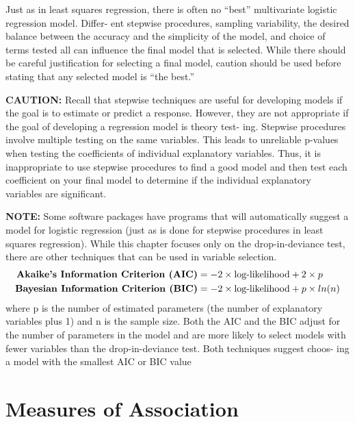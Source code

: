 \documentclass[
]{report}
\begin{document}
Just as in least squares regression, there is often no ``best'' multivariate logistic regression model. Differ-
ent stepwise procedures, sampling variability, the desired balance between the accuracy and the simplicity
of the model, and choice of terms tested all can influence the final model that is selected. While there should
be careful justification for selecting a final model, caution should be used before stating that any selected
model is ``the best.''

\large

\textbf{CAUTION:}
Recall that stepwise techniques are useful for developing models if the goal is to estimate or predict a
response. However, they are not appropriate if the goal of developing a regression model is theory test-
ing. Stepwise procedures involve multiple testing on the same variables. This leads to unreliable p-values
when testing the coefficients of individual explanatory variables. Thus, it is inappropriate to use stepwise
procedures to find a good model and then test each coefficient on your final model to determine if the
individual explanatory variables are significant.
\normalsize 

\large

\textbf{NOTE:}
Some software packages have programs that will automatically suggest a model for logistic regression
(just as is done for stepwise procedures in least squares regression). While this chapter focuses only on
the drop-in-deviance test, there are other techniques that can be used in variable selection.
\begin{align}
\textbf{Akaike’s Information Criterion (AIC)} &= -2 \times \text{log-likelihood} + 2 \times p \notag \\
\textbf{Bayesian Information Criterion (BIC)} &= -2 \times \text{log-likelihood} + p \times ln(n) \notag
\end{align}
where p is the number of estimated parameters (the number of explanatory variables plus 1) and n is the
sample size. Both the AIC and the BIC adjust for the number of parameters in the model and are more
likely to select models with fewer variables than the drop-in-deviance test. Both techniques suggest choos-
ing a model with the smallest AIC or BIC value
\normalsize 

\hypertarget{measures-of-association-1}{%
\section{\texorpdfstring{\textbf{Measures of Association}}{Measures of Association}}\label{measures-of-association-1}}
\end{document}
